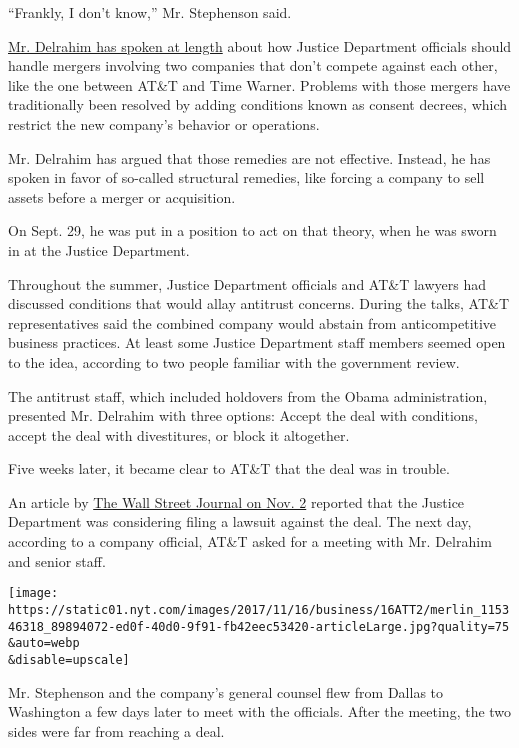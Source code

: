 ``Frankly, I don't know,'' Mr. Stephenson said.

\href{https://www.nytimes.com/2017/11/09/technology/justice-department-antitrust.html}{Mr.
Delrahim has spoken at length} about how Justice Department officials
should handle mergers involving two companies that don't compete against
each other, like the one between AT\&T and Time Warner. Problems with
those mergers have traditionally been resolved by adding conditions
known as consent decrees, which restrict the new company's behavior or
operations.

Mr. Delrahim has argued that those remedies are not effective. Instead,
he has spoken in favor of so-called structural remedies, like forcing a
company to sell assets before a merger or acquisition.

On Sept. 29, he was put in a position to act on that theory, when he was
sworn in at the Justice Department.

Throughout the summer, Justice Department officials and AT\&T lawyers
had discussed conditions that would allay antitrust concerns. During the
talks, AT\&T representatives said the combined company would abstain
from anticompetitive business practices. At least some Justice
Department staff members seemed open to the idea, according to two
people familiar with the government review.

The antitrust staff, which included holdovers from the Obama
administration, presented Mr. Delrahim with three options: Accept the
deal with conditions, accept the deal with divestitures, or block it
altogether.

Five weeks later, it became clear to AT\&T that the deal was in trouble.

An article by
\href{https://www.wsj.com/articles/u-s-weighs-suit-against-at-ts-deal-for-time-warner-1509633797}{The
Wall Street Journal on Nov. 2} reported that the Justice Department was
considering filing a lawsuit against the deal. The next day, according
to a company official, AT\&T asked for a meeting with Mr. Delrahim and
senior staff.

\texttt{[image: https://static01.nyt.com/images/2017/11/16/business/16ATT2/merlin\_115346318\_89894072-ed0f-40d0-9f91-fb42eec53420-articleLarge.jpg?quality=75\\\&auto=webp\\\&disable=upscale]}

Mr. Stephenson and the company's general counsel flew from Dallas to
Washington a few days later to meet with the officials. After the
meeting, the two sides were far from reaching a deal.

